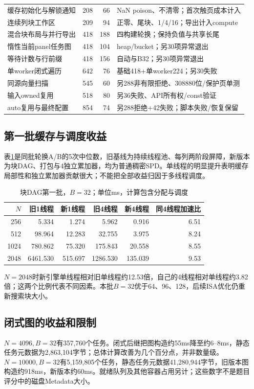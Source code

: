 \documentclass[UTF8,a4paper,11pt]{ctexart}
\begin{document}
\begin{longtable}{@{}p{40mm}rrp{56mm}@{}}
缓存初始化与解锁通知&208&66&NaN poison、不清零；首次触页成本计入\\
连续列块工作区&209&94&正零、尾块、1/4/16；导出计入compute\\
混合块布局与并行导出&418&188&四构建轮换；保持负值与共享长尾\\
惰性当前panel任务图&418&104&heap/bucket；另30项异常退出\\
等待计数与行前缀&418&156&自动与B32；另30项异常退出\\
单worker闭式遍历&642&76&基础418+单worker224；另30失败\\
同源向量扫描&545&60&另288非有限拒绝、308880位/保护页单测\\
输入owned复用&518&80&另36失败、API所有权/const验证\\
auto复用与最终配置&854&74&另288拒绝+42失败；脚本失败/恢复保留\\\bottomrule
\end{longtable}\endgroup

\subsection{第一批缓存与调度收益}
表\ref{tab:phase1}是同批轮换A/B的5次中位数，旧基线为持续线程池、每列两阶段屏障，新版本为块DAG、打包与4独立累加器，均为普通稠密SPD。单线程的明显提升表明缓存局部性和独立累加器贡献很大；不能把全部收益归因于多线程调度。
\begin{table}[htbp]\centering\small
\caption{块DAG第一批，$B=32$；单位ms，计算包含分配与调度}\label{tab:phase1}
\begin{tabular}{rrrrrr}\toprule
$N$&旧1线程&新1线程&旧4线程&新4线程&同4线程加速比\\\midrule
256&5.334&1.274&5.962&0.916&6.51\\
512&98.964&12.283&32.755&3.975&8.24\\
1024&780.862&75.320&175.843&20.558&8.55\\
2048&6461.530&515.697&1286.530&135.039&9.53\\\bottomrule
\end{tabular}
\end{table}
$N=2048$时新引擎单线程相对旧单线程约12.53倍，自己的4线程相对单线程约3.82倍；这两个比例代表不同因素。本批$B=32$优于64、96、128，后续ISA优化仍重新搜索块大小。

\subsection{闭式图的收益和限制}
$N=4096,B=32$有357,760个任务。闭式后继把图构造约55ms降至约6--8ms，静态任务元数据为2,863,104字节；总体计算改善为几个百分点，并非数量级。$N=10000,B=32$有5,159,805个任务，静态任务元数据41,280,944字节，旧版本图构造约918ms，新版本约60ms。就绪队列及其他容器占用另计；这些数字不是题目评分中的磁盘Metadata大小。
\end{document}
